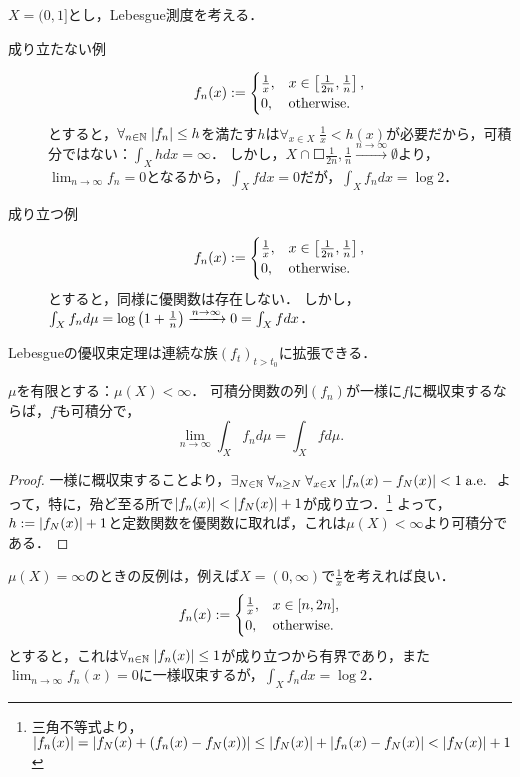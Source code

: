 \documentclass[uplatex, dvipdfmx]{jsreport}
\begin{document}
\begin{remark}[優関数が取れない場合は定理が成立することもしないこともある]
    $X=(0,1]$とし，Lebesgue測度を考える．
    \begin{description}
        \item[成り立たない例] \[f_n(x):=\begin{cases}
            \frac{1}{x},&x\in\left[\frac{1}{2n},\frac{1}{n}\right],\\
            0,&\mathrm{otherwise}.
        \end{cases}\]とすると，$\forall_{n\in\mathbb{N}}\;\lvert f_n\rvert\le h$を満たす$h$は$\forall_{x\in X}\;\frac{1}{x}<h(x)$が必要だから，可積分ではない：$\int_Xhdx=\infty$．
        しかし，$X\cap\Square{\frac{1}{2n},\frac{1}{n}}\xrightarrow{n\to\infty}\emptyset$より，$\lim_{n\to\infty}f_n=0$となるから，$\int_Xfdx=0$だが，$\int_Xf_ndx=\log 2$．
        \item[成り立つ例]
        \[f_n(x):=\begin{cases}
            \frac{1}{x},&x\in\left[\frac{1}{2n},\frac{1}{n}\right],\\
            0,&\mathrm{otherwise}.
        \end{cases}\]とすると，同様に優関数は存在しない．
        しかし，$\int_Xf_nd\mu=\log\left(1+\frac{1}{n}\right)\xrightarrow{n\to\infty}0=\int_Xfdx$．
    \end{description}
\end{remark}
\begin{remark}[微分と積分との交換に向けて]
    Lebesgueの優収束定理は連続な族$(f_t)_{t>t_0}$に拡張できる．
\end{remark}

\begin{corollary}[一様収束する可積分関数列の積分は収束する]
    $\mu$を有限とする：$\mu(X)<\infty$．
    可積分関数の列$(f_n)$が一様に$f$に概収束するならば，$f$も可積分で，
    \[\lim_{n\to\infty}\int_Xf_nd\mu=\int_Xfd\mu.\]
\end{corollary}
\begin{proof}
    一様に概収束することより，$\exists_{N\in\mathbb{N}}\;\forall_{n\ge N}\;\forall_{x\in X}\;\lvert f_n(x)-f_N(x)\rvert<1\;\mathrm{a.e.}\;$
    よって，特に，殆ど至る所で$\lvert f_n(x)\rvert<\lvert f_N(x)\rvert+1$が成り立つ．\footnote{三角不等式より，$\lvert f_n(x)\rvert=\lvert f_N(x)+(f_n(x)-f_N(x))\rvert\le\lvert f_N(x)\rvert+\lvert f_n(x)-f_N(x)\rvert<\lvert f_N(x)\rvert+1$}
    よって，$h:=\lvert f_N(x)\rvert+1$と定数関数を優関数に取れば，これは$\mu(X)<\infty$より可積分である．
\end{proof}

\begin{remark}[測度が有限でない場合の反例]
    $\mu(X)=\infty$のときの反例は，例えば$X=(0,\infty)$で$\frac{1}{x}$を考えれば良い．
    \[f_n(x):=\begin{cases}
        \frac{1}{x},&x\in[n,2n],\\
        0,&\mathrm{otherwise}.
    \end{cases}\]とすると，これは$\forall_{n\in\mathbb{N}}\;\lvert f_n(x)\rvert\le 1$が成り立つから有界であり，また$\lim_{n\to\infty}f_n(x)=0$に一様収束するが，$\int_Xf_ndx=\log 2$．
\end{remark}
\end{document}
